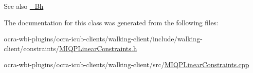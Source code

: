 \begin{DoxySeeAlso}{\-See also}
\hyperlink{classMIQPLinearConstraints_a0c0fbbb1b86c5d51a133ee661977c1f5}{\-\_\-\-Bh} 
\end{DoxySeeAlso}


\-The documentation for this class was generated from the following files\-:\begin{DoxyCompactItemize}
\item 
ocra-\/wbi-\/plugins/ocra-\/icub-\/clients/walking-\/client/include/walking-\/client/constraints/\hyperlink{MIQPLinearConstraints_8h}{\-M\-I\-Q\-P\-Linear\-Constraints.\-h}\item 
ocra-\/wbi-\/plugins/ocra-\/icub-\/clients/walking-\/client/src/\hyperlink{MIQPLinearConstraints_8cpp}{\-M\-I\-Q\-P\-Linear\-Constraints.\-cpp}\end{DoxyCompactItemize}
